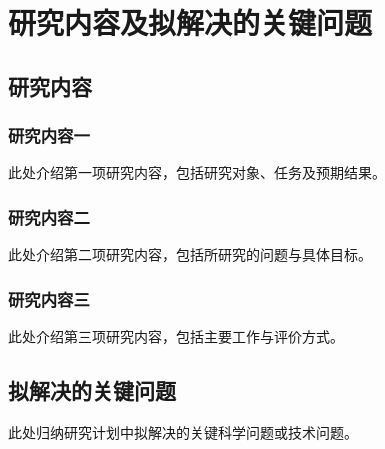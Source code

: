 \chapter{研究内容及拟解决的关键问题}

\section{研究内容}
\subsection{研究内容一}
此处介绍第一项研究内容，包括研究对象、任务及预期结果。

\subsection{研究内容二}
此处介绍第二项研究内容，包括所研究的问题与具体目标。

\subsection{研究内容三}
此处介绍第三项研究内容，包括主要工作与评价方式。

\section{拟解决的关键问题}
此处归纳研究计划中拟解决的关键科学问题或技术问题。
